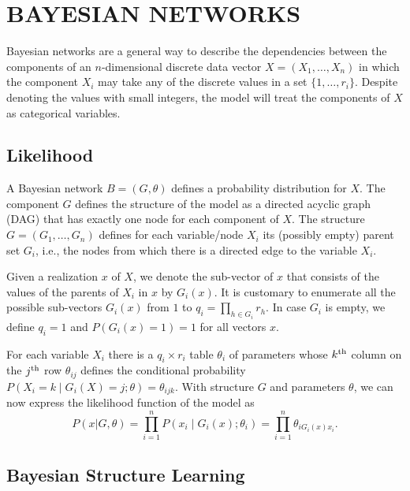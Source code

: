 \section{BAYESIAN NETWORKS}
\label{sec:bns}

Bayesian networks are a general way to describe the dependencies
between the components of an $n$\nobreakdash-dimensional discrete data
vector $X=(X_{1},\ldots,X_{n})$ in which the component $X_{i}$ may
take any of the discrete values in a set $\{1,\ldots,r_{i}\}$.
Despite denoting the values with small integers, the model will treat
the components of $X$ as categorical variables.


\subsection{Likelihood}
\label{ssec:likelihood}

A Bayesian network $B=(G,\theta)$ defines a probability distribution for
$X$. The component $G$ defines the structure of the model as a
directed acyclic graph (DAG) that has exactly one node for each component of
$X$. The structure $G=(G_{1},\ldots,G_{n})$ defines for each
variable/node $X_{i}$ its (possibly empty) parent set $G_{i}$, i.e.,
the nodes from which there is a directed edge to the variable
$X_{i}$.

Given a realization $x$ of $X$, we denote the sub\nobreakdash-vector
of $x$ that consists of the values of the parents of $X_{i}$ in $x$ by
$G_{i}(x)$. It is customary to enumerate all the possible
sub\nobreakdash-vectors $G_{i}(x)$ from $1$ to $q_{i}=\prod_{h\in
  G_{i}}r_{h}.$ In case $G_{i}$ is empty, we define $q_{i}=1$ and
$P(G_{i}(x)=1)=1$ for all vectors $x$.

For each variable $X_{i}$ there is a $q_{i}\times r_{i}$ table
$\theta_{i}$ of parameters whose $k^{\textnormal{th}}$ column
on the $j^{\textnormal{th}}$ row $\theta_{ij}$ defines the conditional
probability $P(X_{i}=k\mid G_{i}(X)=j;\theta)=\theta_{ijk}$.  With
structure $G$ and parameters $\theta$, we can now express the
likelihood function of the model as
\begin{equation}
P(x|G,\theta)=\prod_{i=1}^{n}P(x_{i}\mid
G_{i}(x);\theta_{i})=\prod_{i=1}^{n}\theta_{iG_{i}(x)x_{i}}.
\end{equation}



\subsection{Bayesian Structure Learning}


